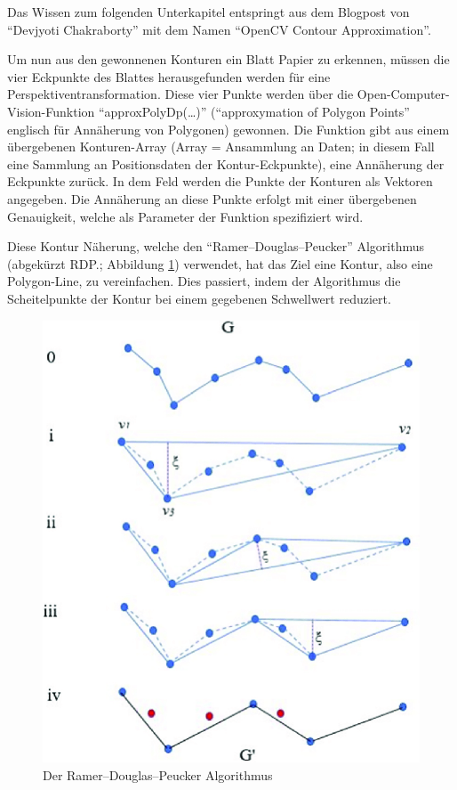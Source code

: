 Das Wissen zum folgenden Unterkapitel entspringt aus dem Blogpost von ``Devjyoti Chakraborty'' mit dem Namen ``OpenCV Contour Approximation''. \cite{approx:cite}

Um nun aus den gewonnenen Konturen ein Blatt Papier zu erkennen, müssen die vier Eckpunkte des Blattes herausgefunden werden für eine Perspektiventransformation. Diese vier Punkte werden über die Open-Computer-Vision-Funktion ``approxPolyDp(\dots)'' (``approxymation of Polygon Points'' englisch für Annäherung von Polygonen) gewonnen. Die Funktion gibt aus einem übergebenen Konturen-Array (Array = Ansammlung an Daten; in diesem Fall eine Sammlung an Positionsdaten der Kontur-Eckpunkte), eine Annäherung der Eckpunkte zurück. In dem Feld werden die Punkte der Konturen als Vektoren angegeben. Die Annäherung an diese Punkte erfolgt mit einer übergebenen Genauigkeit, welche als Parameter der Funktion spezifiziert wird.

Diese Kontur Näherung, welche den ``Ramer–Douglas–Peucker'' Algorithmus (abgekürzt RDP.; Abbildung \ref{fig:map:rdpalgo}) verwendet, hat das Ziel eine Kontur, also eine Polygon-Line, zu vereinfachen. Dies passiert, indem der Algorithmus die Scheitelpunkte der Kontur bei einem gegebenen Schwellwert reduziert.


\begin{figure}[H]
  \centering
  \includegraphics[scale=0.3]{pics/bildverarbeitungsalgos/The-Ramer-Douglas-Peucker-algorithm.png}
  \caption{Der Ramer–Douglas–Peucker Algorithmus \cite{maai:rdpa:cite}}
  \label{fig:map:rdpalgo}
\end{figure}

